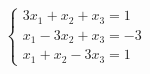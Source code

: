 \documentclass[preview]{standalone}
\begin{document}
\begin{align*}
\begin{cases}3x_1 + x_2 + x_3 = 1 \\x_1 - 3x_2 + x_3 = -3 \\x_1 + x_2 - 3x_3 = 1\end{cases}
\end{align*}
\end{document}
